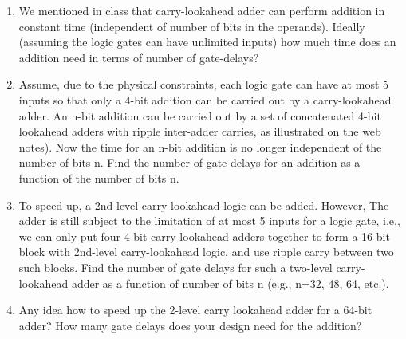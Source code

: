 \item 
\begin{enumerate}
\item We mentioned in class that carry-lookahead adder can perform addition
        in constant time (independent of number of bits in the operands). 
        Ideally (assuming the logic gates can have unlimited inputs) how much 
        time does an addition need in terms of number of gate-delays? 
\item Assume, due to the physical constraints, each logic gate can have at
        most 5 inputs so that only a 4-bit addition can be carried out by a
        carry-lookahead adder. An n-bit addition can be carried out by a
        set of concatenated 4-bit lookahead adders with ripple inter-adder 
        carries, as illustrated on the web notes). Now the time for an n-bit 
	addition is no longer independent of the number of bits n. Find the 
	number of gate delays for an addition as a function of the number of 
	bits n.
\item To speed up, a 2nd-level carry-lookahead logic can be added. However,
        The adder is still subject to the limitation of at most 5 inputs for 
	a logic gate, i.e., we can only put four 4-bit carry-lookahead adders 
        together to form a 16-bit block with 2nd-level carry-lookahead logic,
        and use ripple carry between two such blocks. Find the number of gate
        delays for such a two-level carry-lookahead adder as a function of
        number of bits n (e.g., n=32, 48, 64, etc.). 
\item Any idea how to speed up the 2-level carry lookahead adder for a 64-bit
        adder? How many gate delays does your design need for the addition?
\end{enumerate}
